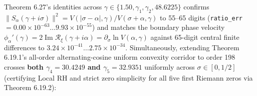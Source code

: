 \documentclass[
  11pt,
]{article}
\begin{document}
\begin{enumerate}
  Theorem 6.27's identities across
  \(\gamma \in \{1.50, \gamma_1, \gamma_2, 48.6225\}\) confirms
  \(\|S_\alpha(\gamma + i\sigma)\|^2 = V(|\sigma-\alpha|, \gamma)/V(\sigma+\alpha, \gamma)\)
  to 55--65 digits (\texttt{ratio\_err}
  \(= 0.00 \times 10^{-63} \dots 9.93 \times 10^{-55}\)) and matches the
  boundary phase velocity
  \(\phi_\alpha'(\gamma) = 2\operatorname{Im}\mathcal{R}_\xi(\gamma + i\alpha) = \partial_\sigma\ln V(\alpha, \gamma)\)
  against 65-digit central finite differences to
  \(3.24 \times 10^{-41} \dots 2.75 \times 10^{-34}\). Simultaneously,
  extending Theorem 6.19.1's all-order alternating-cosine uniform
  convexity corridor to order 198 crosses \textbf{both
  \(\gamma_4 = 30.4249\) and \(\gamma_5 = 32.9351\)} uniformly across
  \(\sigma \in [0, 1/2]\) (certifying Local RH and strict zero
  simplicity for all five first Riemann zeros via Theorem 6.19.2):


\end{enumerate}
\end{document}
